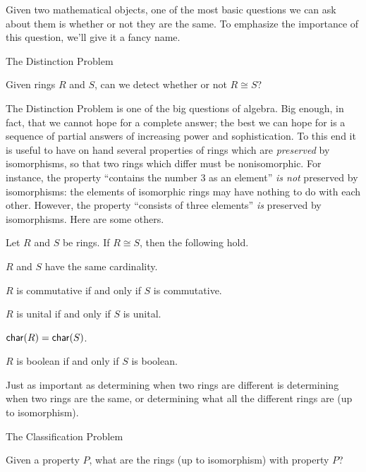 Given two mathematical objects, one of the most basic questions we can ask about them is whether or not they are the same.
To emphasize the importance of this question, we'll give it a fancy name.

\begin{titlebox}{The Distinction Problem}
\begin{center}
Given rings \(R\) and \(S\), can we detect whether or not \(R \cong S\)?
\end{center}
\end{titlebox}

The Distinction Problem is one of the big questions of algebra.
Big enough, in fact, that we cannot hope for a complete answer; the best we can hope for is a sequence of partial answers of increasing power and sophistication. To this end it is useful to have on hand several properties of rings which are \emph{preserved} by isomorphisms, so that two rings which differ must be nonisomorphic.
For instance, the property ``contains the number 3 as an element'' \emph{is not} preserved by isomorphisms: the elements of isomorphic rings may have nothing to do with each other.
However, the property ``consists of three elements'' \emph{is} preserved by isomorphisms.
Here are some others.

\begin{prop} \label{prop:iso-preserved-props}
Let \(R\) and \(S\) be rings.
If \(R \cong S\), then the following hold.
\begin{proplist*}
\item \(R\) and \(S\) have the same cardinality.
\item \(R\) is commutative if and only if \(S\) is commutative.
\item \(R\) is unital if and only if \(S\) is unital.
\item \(\mathsf{char}(R) = \mathsf{char}(S)\).
\item \(R\) is boolean if and only if \(S\) is boolean.
\end{proplist*}
\end{prop}

Just as important as determining when two rings are different is determining when two rings are the same, or determining what all the different rings are (up to isomorphism).

\begin{titlebox}{The Classification Problem}
\begin{center}
Given a property \(P\), what are the rings (up to isomorphism) with property \(P\)?
\end{center}
\end{titlebox}

